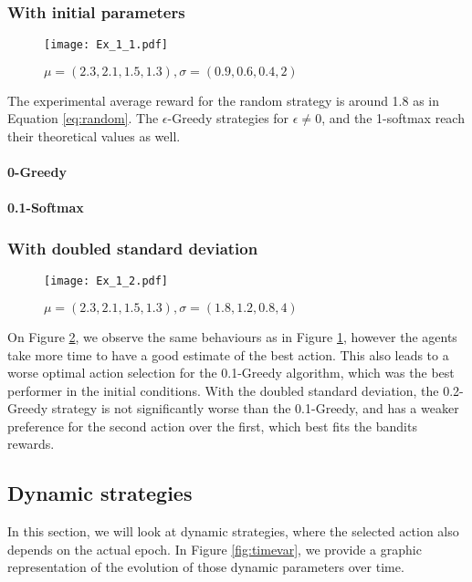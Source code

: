 \documentclass[a4paper,11pt]{article}
\begin{document}
\subsubsection{With initial parameters}
\begin{figure}[H]
  \center
  \texttt{[image: Ex\_1\_1.pdf]}
  \caption{\label{fig:1.1} $\mu = (2.3, 2.1, 1.5, 1.3), \sigma = (0.9, 0.6, 0.4, 2)$}
\end{figure}

The experimental average reward for the random strategy is around 1.8 as in Equation \ref{eq:random}. The $\epsilon$-Greedy strategies for $\epsilon \neq 0$, and the 1-softmax reach their theoretical values as well.

\paragraph{0-Greedy}

\paragraph{0.1-Softmax}

\subsubsection{With doubled standard deviation}
\begin{figure}[H]
  \center
  \texttt{[image: Ex\_1\_2.pdf]}
  \caption{\label{fig:1.2} $\mu = (2.3, 2.1, 1.5, 1.3), \sigma = (1.8, 1.2, 0.8, 4)$}
\end{figure}

On Figure \ref{fig:1.2}, we observe the same behaviours as in Figure \ref{fig:1.1}, however the agents take more time to have a good estimate of the best action. This also leads to a worse optimal action selection for the 0.1-Greedy algorithm, which was the best performer in the initial conditions. With the doubled standard deviation, the 0.2-Greedy strategy is not significantly worse than the 0.1-Greedy, and has a weaker preference for the second action over the first, which best fits the bandits rewards.

\subsection{Dynamic strategies}
In this section, we will look at dynamic strategies, where the selected action also depends on the actual epoch. In Figure \ref{fig:timevar}, we provide a graphic representation of the evolution of those dynamic parameters over time.
\end{document}
